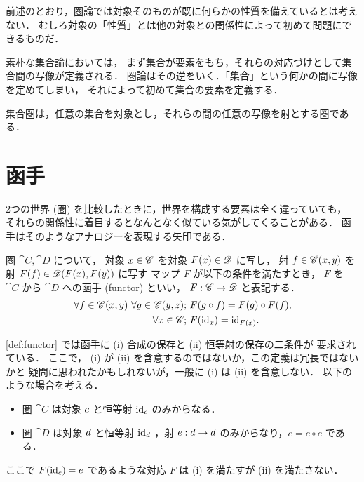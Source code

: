 \documentclass[titlepage]{ltjsreport}
\begin{document}
前述のとおり，圏論では対象そのものが既に何らかの性質を備えているとは考えない．
むしろ対象の「性質」とは他の対象との関係性によって初めて問題にできるものだ．

素朴な集合論においては，
まず集合が要素をもち，それらの対応づけとして集合間の写像が定義される．
圏論はその逆をいく．「集合」という何かの間に写像を定めてしまい，
それによって初めて集合の要素を定義する．

\begin{definition}[集合圏]
  集合圏は，任意の集合を対象とし，それらの間の任意の写像を射とする圏である．
\end{definition}

\section{函手}

2つの世界 (圏) を比較したときに，世界を構成する要素は全く違っていても，
それらの関係性に着目するとなんとなく似ている気がしてくることがある．
函手はそのようなアナロジーを表現する矢印である．
\begin{definition}[函手]\label{def:functor}
  \def\C{\cat{C}}%
  \def\D{\cat{D}}%
  \def\x{\obj{x}}%
  \def\y{\obj{y}}%
  \def\z{\obj{z}}%
  圏 $\C,\D$ について，
  対象 $\x\in\objs{\C}$ を対象 $F(\x)\in\objs{\D}$ に写し，
  射 $f\in\mrps{\C}{\x}{\y}$ を射 $F(f)\in\mrps{\D}{F(\x)}{F(\y)}$ に写す
  マップ $F$ が以下の条件を満たすとき，
  $F$ を $\C$ から $\D$ への函手 (functor) といい，
  $\mrp{F}{\C}{\D}$ と表記する．
  \begin{align}
    \forall f\in\mrps{\C}{\x}{\y}\ \forall g\in\mrps{\C}{\y}{\z};
     & \ F(g\circ f)=F(g)\circ F(f), \\
    \forall\x\in\objs{\C};
     & \ F(\id{\x})=\id{F(\x)}.
  \end{align}
  \begin{center}
    
  \end{center}
\end{definition}

\begin{shadebox}
  \def\C{\cat{C}}%
  \def\D{\cat{D}}%
  \def\c{\obj{c}}%
  \def\d{\obj{d}}%
  \def\e{e}%
  \def\F{F}%
  \cref{def:functor} では函手に (i) 合成の保存と (ii) 恒等射の保存の二条件が
  要求されている．
  ここで， (i) が (ii) を含意するのではないか，この定義は冗長ではないかと
  疑問に思われたかもしれないが，一般に (i) は (ii) を含意しない．
  以下のような場合を考える．
  \begin{itemize}
    \item 圏 $\C$ は対象 $\c$ と恒等射 $\id{\c}$ のみからなる．
    \item 圏 $\D$ は対象 $\d$ と恒等射 $\id{\d}$ ，射 $\mrp{e}{\d}{\d}$
          のみからなり，$\e=\e\circ\e$ である．
  \end{itemize}
  ここで $\F(\id{\c})=\e$ であるような対応 $\F$ は
  (i) を満たすが (ii) を満たさない．
\end{shadebox}
\end{document}
